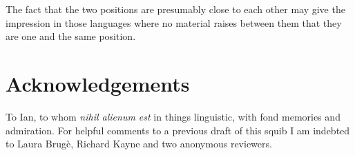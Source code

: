 \documentclass[output=paper]{langsci/langscibook}
\begin{document}
The fact that the two positions are presumably close to each other may give the
impression in those languages where no material raises between them that they
are one and the same position.

\printchapterglossary{}

\section*{Acknowledgements}

To Ian, to whom \emph{nihil alienum est} in things linguistic, with fond
memories and admiration. For helpful comments to a previous draft of this squib
I am indebted to Laura Brugè, Richard Kayne and two anonymous reviewers.

{\sloppy
\printbibliography[heading=subbibliography,notkeyword=this]
}
\end{document}

